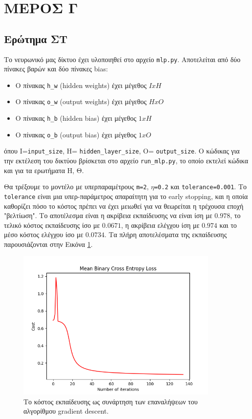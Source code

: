 \documentclass{article}
\newcommand{\code}{\texttt}
\begin{document}
\section{ΜΕΡΟΣ Γ}

\subsection{Ερώτημα ΣΤ}

Το νευρωνικό μας δίκτυο έχει υλοποιηθεί στο αρχείο \code{mlp.py}. Αποτελείται από δύο πίνακες βαρών και δύο πίνακες bias:
\begin{itemize}
	\item  Ο πίνακας \code{h\_w} (hidden weights) έχει μέγεθος $IxH$
	\item  Ο πίνακας \code{o\_w} (output weights) έχει μέγεθος $HxO$
	\item  Ο πίνακας \code{h\_b} (hidden bias) έχει μέγεθος $1xH$
	\item  Ο πίνακας \code{o\_b} (output bias) έχει μέγεθος $1xO$
\end{itemize}
όπου I=\code{input\_size}, H= \code{hidden\_layer\_size}, O= \code{output\_size}. Ο κώδικας για την εκτέλεση του δικτύου βρίσκεται στο αρχείο \code{run\_mlp.py}, το οποίο εκτελεί κώδικα και για τα ερωτήματα Η, Θ.

Θα τρέξουμε το μοντέλο με υπερπαραμέτρους \code{m=2}, \code{$\eta$=0.2} και \code{tolerance=0.001}. Το \code{tolerance} είναι μια υπερ-παράμετρος απαραίτητη για το early stopping, και η οποία καθορίζει πόσο το κόστος πρέπει να έχει μειωθεί για να θεωρείται η τρέχουσα εποχή "βελτίωση". Το αποτέλεσμα είναι η ακρίβεια εκπαίδευσης να είναι ίση με $0.978$, το τελικό κόστος εκπαίδευσης ίσο με $0.0671$, η ακρίβεια ελέγχου ίση με $0.974$ και το μέσο κόστος ελέγχου ίσο με $0.0734$. Τα πλήρη αποτελέσματα της εκπαίδευσης παρουσιάζονται στην Εικόνα \ref{mlp_train_test}.

\begin{figure}
	\includegraphics[width=10cm]{mlp_error.png}
	\centering
	\caption{Το κόστος εκπαίδευσης ως συνάρτηση των επαναλήψεων του αλγορίθμου gradient descent.}
	\label{mlp_train_test}
\end{figure}
\end{document}
